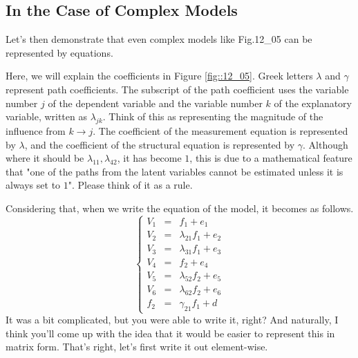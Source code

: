 \documentclass{ltjsbook}
\begin{document}
\subsection{In the Case of Complex Models}

Let's then demonstrate that even complex models like Fig.12_05 can be represented by equations.

Here, we will explain the coefficients in Figure \ref{fig::12_05}. Greek letters $\lambda$ and $\gamma$ represent path coefficients. The subscript of the path coefficient uses the variable number $j$ of the dependent variable and the variable number $k$ of the explanatory variable, written as $\lambda_{jk}$. Think of this as representing the magnitude of the influence from $k \to j$. The coefficient of the measurement equation is represented by $\lambda$, and the coefficient of the structural equation is represented by $\gamma$. Although where it should be $\lambda_{11},\lambda_{42}$, it has become $1$, this is due to a mathematical feature that "one of the paths from the latent variables cannot be estimated unless it is always set to $1$". Please think of it as a rule.

Considering that, when we write the equation of the model, it becomes as follows.
\[ \left \{
	\begin{array}{rcl}
		V_1 & = & f_1 + e_1             \\
		V_2 & = & \lambda_{21}f_1 + e_2 \\
		V_3 & = & \lambda_{31}f_1 + e_3 \\
		V_4 & = & f_2 + e_4             \\
		V_5 & = & \lambda_{52}f_2 + e_5 \\
		V_6 & = & \lambda_{62}f_2 + e_6 \\
		f_2 & = & \gamma_{21}f_1 + d
	\end{array}
	\right .
\]
It was a bit complicated, but you were able to write it, right? And naturally, I think you'll come up with the idea that it would be easier to represent this in matrix form. That's right, let's first write it out element-wise.
\end{document}
